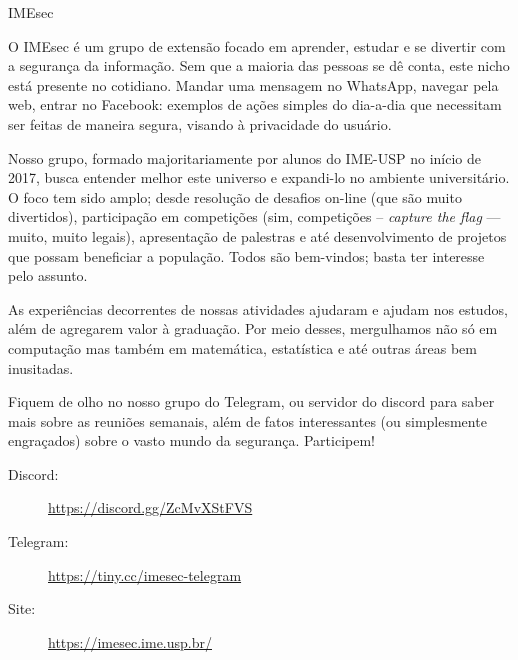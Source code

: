 \begin{subsecao}{IMEsec}


O IMEsec é um grupo de extensão focado em aprender, estudar e se divertir com a
segurança da informação. Sem que a maioria das pessoas se dê conta, este nicho
está presente no cotidiano. Mandar uma mensagem no WhatsApp, navegar pela web,
entrar no Facebook: exemplos de ações simples do dia-a-dia que necessitam ser
feitas de maneira segura, visando à privacidade do usuário.

Nosso grupo, formado majoritariamente por alunos do IME-USP no início de 2017,
busca entender melhor este universo e expandi-lo no ambiente universitário. O
foco tem sido amplo; desde resolução de desafios on-line (que são muito
divertidos), participação em competições (sim, competições -- \textit{capture the
flag} — muito, muito legais), apresentação de palestras e até desenvolvimento de
projetos que possam beneficiar a população. Todos são bem-vindos; basta ter
interesse pelo assunto.

As experiências decorrentes de nossas atividades ajudaram e ajudam nos estudos,
além de agregarem valor à graduação. Por meio desses, mergulhamos não só em
computação mas também em matemática, estatística e até outras áreas bem
inusitadas.

Fiquem de olho no nosso grupo do Telegram, ou servidor do discord para saber
mais sobre as reuniões semanais, além de fatos interessantes (ou simplesmente
engraçados) sobre o vasto mundo da segurança. Participem!

\begin{description}
  \item[Discord:] \url{https://discord.gg/ZcMvXStFVS}
  \item[Telegram:] \url{https://tiny.cc/imesec-telegram}
  \item[Site:] \url{https://imesec.ime.usp.br/}
\end{description}

\end{subsecao}
